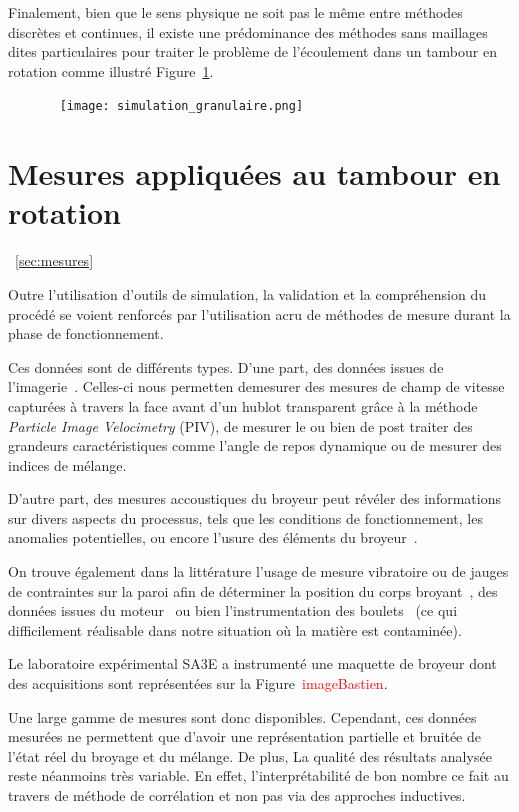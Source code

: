 Finalement, bien que le sens physique ne soit pas le même entre méthodes discrètes et continues, il existe une prédominance des méthodes sans maillages dites particulaires pour traiter le problème de l'écoulement dans un tambour en rotation comme illustré Figure~\ref{fig:simu_granulaire}.

\begin{figure}~\label{fig:simu_granulaire}
    \texttt{[image: simulation\_granulaire.png]}
\end{figure}

\section{Mesures appliquées au tambour en rotation}~\ref{sec:mesures}

Outre l'utilisation d'outils de simulation, la validation et la compréhension du procédé se voient renforcés par l'utilisation acru de méthodes de mesure durant la phase de fonctionnement.

Ces données sont de différents types. D'une part, des données issues de l'imagerie~\cite{jarray_wet_2019,Adepu}. Celles-ci nous permetten demesurer des mesures de champ de vitesse capturées à travers la face avant d'un hublot transparent grâce à la méthode \textit{Particle Image Velocimetry} (PIV), de mesurer le ou bien de post traiter des grandeurs caractéristiques comme l'angle de repos dynamique ou de mesurer des indices de mélange.

D'autre part, des mesures accoustiques du broyeur peut révéler des informations sur divers aspects du processus, tels que les conditions de fonctionnement, les anomalies potentielles, ou encore l'usure des éléments du broyeur~\cite{Owusu, almond}.

On trouve également dans la littérature l'usage de mesure vibratoire ou de jauges de contraintes sur la paroi afin de déterminer la position du corps broyant~\cite{Davey, tano_2005}, des données issues du moteur~\cite{pedrayes_frequency_2017} ou bien l'instrumentation des boulets~\cite{Wang} (ce qui difficilement réalisable dans notre situation où la matière est contaminée).

Le laboratoire expérimental SA3E a instrumenté une maquette de broyeur dont des acquisitions sont représentées sur la Figure~\textcolor{red}{imageBastien}.

Une large gamme de mesures sont donc disponibles. Cependant, ces données mesurées ne permettent que d'avoir une représentation partielle et bruitée de l'état réel du broyage et du mélange. De plus, La qualité des résultats analysée reste néanmoins très variable. En effet, l'interprétabilité de bon nombre ce fait au travers de méthode de corrélation et non pas via des approches inductives.

